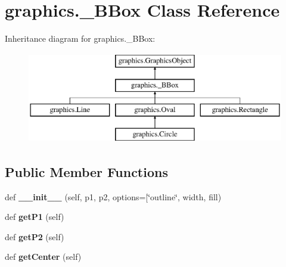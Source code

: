 \hypertarget{classgraphics_1_1___b_box}{}\section{graphics.\+\_\+\+B\+Box Class Reference}
\label{classgraphics_1_1___b_box}
Inheritance diagram for graphics.\+\_\+\+B\+Box\+:\begin{figure}[H]
\begin{center}
\leavevmode
\includegraphics[height=4.000000cm]{classgraphics_1_1___b_box}
\end{center}
\end{figure}
\subsection*{Public Member Functions}
\begin{DoxyCompactItemize}
\item 
def {\bfseries \+\_\+\+\_\+init\+\_\+\+\_\+} (self, p1, p2, options=\mbox{[}\char`\"{}outline\char`\"{}, width, fill)\hypertarget{classgraphics_1_1___b_box_a5738b02041db947dbbcb555ad6e6095a}{}\label{classgraphics_1_1___b_box_a5738b02041db947dbbcb555ad6e6095a}

\item 
def {\bfseries get\+P1} (self)\hypertarget{classgraphics_1_1___b_box_a2c3e73e8149fd0036055b94d28c3fbb4}{}\label{classgraphics_1_1___b_box_a2c3e73e8149fd0036055b94d28c3fbb4}

\item 
def {\bfseries get\+P2} (self)\hypertarget{classgraphics_1_1___b_box_aee9d6dc9fcb9eb74ee8281662d87f361}{}\label{classgraphics_1_1___b_box_aee9d6dc9fcb9eb74ee8281662d87f361}

\item 
def {\bfseries get\+Center} (self)\hypertarget{classgraphics_1_1___b_box_a7ffb5899c2626c1d882dae28b9eaf211}{}\label{classgraphics_1_1___b_box_a7ffb5899c2626c1d882dae28b9eaf211}

\end{DoxyCompactItemize}
